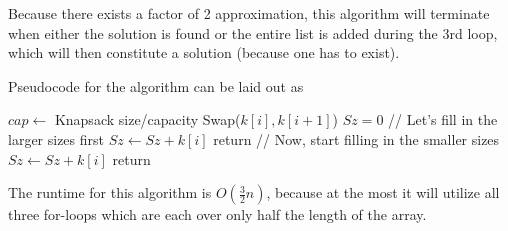 \documentclass{article}
\begin{document}
Because there exists a factor of 2 approximation, this algorithm will
terminate when either the solution is found or the entire list is
added during the 3rd loop, which will then constitute a solution
(because one has to exist).

Pseudocode for the algorithm can be laid out as 
{\singlespacing
\begin{algorithmic}
  \State $cap \gets$ Knapsack size/capacity
  \State Swap($k[i],k[i+1]$)
  \EndIf
  \EndFor
  \State $Sz = 0$
  \State // Let's fill in the larger sizes first
  \State $Sz \gets Sz + k[i]$
  \EndIf
  \State return
  \EndIf
  \EndFor
  \State // Now, start filling in the smaller sizes
  \State $Sz \gets Sz + k[i]$
  \EndIf
  \State return
  \EndIf
  \EndFor
\end{algorithmic}
}
The runtime for this algorithm is $O(\frac{3}{2}n)$, because at the
most it will utilize all three for-loops which are each over only half
the length of the array.
\end{document}
